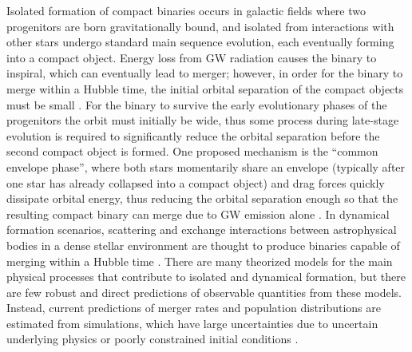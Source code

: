 Isolated formation of compact binaries occurs in galactic fields where two progenitors are born gravitationally bound, and isolated from interactions with other stars undergo standard main sequence evolution, each eventually forming into a compact object. Energy loss from GW radiation causes the binary to inspiral, which can eventually lead to merger; however, in order for the binary to merge within a Hubble time, the initial orbital separation of the compact objects must be small \citep{10.1051/0004-6361/201936204,10.1007/s41114-021-00034-3}. For the binary to survive the early evolutionary phases of the progenitors the orbit must initially be wide, thus some process during late-stage evolution is required to significantly reduce the orbital separation before the second compact object is formed. One proposed mechanism is the ``common envelope phase'', where both stars momentarily share an envelope (typically after one star has already collapsed into a compact object) and drag forces quickly dissipate orbital energy, thus reducing the orbital separation enough so that the resulting compact binary can merge due to GW emission alone \citep{10.1038/nature18322}. In dynamical formation scenarios, scattering and exchange interactions between astrophysical bodies in a dense stellar environment are thought to produce binaries capable of merging within a Hubble time \citep{1602.02444}. There are many theorized models for the main physical processes that contribute to isolated and dynamical formation, but there are few robust and direct predictions of observable quantities from these models. Instead, current predictions of merger rates and population distributions are estimated from simulations, which have large uncertainties due to uncertain underlying physics or poorly constrained initial conditions \citep{10.1007/s41114-021-00034-3,10.1051/0004-6361/201936204,1806.00001v3,1308.1546}.


